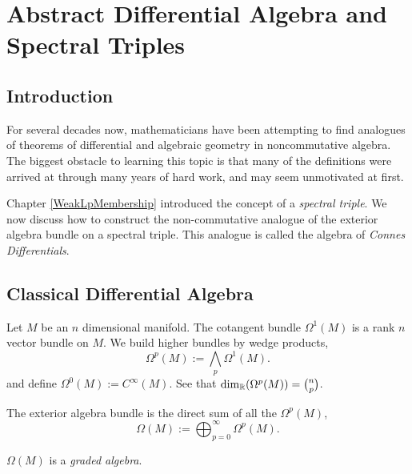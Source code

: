 
\chapter{Abstract Differential Algebra and Spectral Triples} %

\label{AbstractDifferentialAlgebra} %




\section{Introduction}
For several decades now, mathematicians have been attempting to find analogues
of theorems of differential and algebraic geometry in noncommutative 
algebra.
The biggest obstacle to learning this topic is that many of the definitions
were arrived at through many years of hard work, and may seem unmotivated at first.

Chapter \ref{WeakLpMembership} introduced the concept of a \emph{spectral triple}.
We now discuss how to construct the non-commutative analogue of the exterior
algebra bundle on a spectral triple. This analogue is called the algebra of \emph{Connes Differentials}.

\section{Classical Differential Algebra}
Let $M$ be an $n$ dimensional manifold. The cotangent bundle $\Omega^1(M)$
is a rank $n$ vector bundle on $M$. We build higher bundles by wedge products,
\begin{equation*}
    \Omega^p(M) := \bigwedge_p \Omega^1(M).
\end{equation*}
and define $\Omega^0(M) := C^\infty(M)$. See that $\dim_{\mathbb{R}}(\Omega^p(M)) = \binom{n}{p}$.


The exterior algebra bundle is the direct sum of all the $\Omega^p(M)$,
\begin{equation*}
    \Omega(M) := \bigoplus_{p=0}^\infty \Omega^p(M).
\end{equation*}


$\Omega(M)$ is a \emph{graded algebra}.


